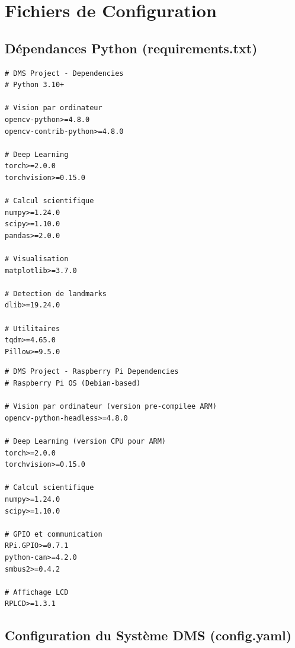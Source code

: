 \documentclass[12pt,a4paper,twoside]{report}
\begin{document}

\chapter{Fichiers de Configuration}

\section{Dépendances Python (requirements.txt)}

\begin{lstlisting}[style=pythonstyle, caption={Fichier requirements.txt -- Dépendances PC.}, language={}]
# DMS Project - Dependencies
# Python 3.10+

# Vision par ordinateur
opencv-python>=4.8.0
opencv-contrib-python>=4.8.0

# Deep Learning
torch>=2.0.0
torchvision>=0.15.0

# Calcul scientifique
numpy>=1.24.0
scipy>=1.10.0
pandas>=2.0.0

# Visualisation
matplotlib>=3.7.0

# Detection de landmarks
dlib>=19.24.0

# Utilitaires
tqdm>=4.65.0
Pillow>=9.5.0
\end{lstlisting}

\begin{lstlisting}[style=pythonstyle, caption={Fichier requirements\_rpi.txt -- Dépendances Raspberry Pi.}, language={}]
# DMS Project - Raspberry Pi Dependencies
# Raspberry Pi OS (Debian-based)

# Vision par ordinateur (version pre-compilee ARM)
opencv-python-headless>=4.8.0

# Deep Learning (version CPU pour ARM)
torch>=2.0.0
torchvision>=0.15.0

# Calcul scientifique
numpy>=1.24.0
scipy>=1.10.0

# GPIO et communication
RPi.GPIO>=0.7.1
python-can>=4.2.0
smbus2>=0.4.2

# Affichage LCD
RPLCD>=1.3.1
\end{lstlisting}

\section{Configuration du Système DMS (config.yaml)}
\end{document}

